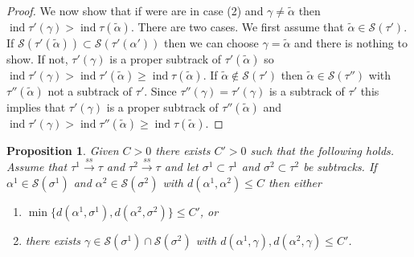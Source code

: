 \documentclass[11pt]{article}
\newtheorem{prop}[thm]{Proposition}
\theoremstyle{remark}
\def\S{{\mathcal S}}
\def\ind{\operatorname{ind}}
\def\ss{{\overset{ss}\longrightarrow}}
\begin{document}
\begin{proof}
We now show that if were are in case (2) and $\gamma \neq \tilde\alpha$ then $\ind \tau'(\gamma) > \ind{\tau}(\tilde\alpha)$. There are two cases. We first assume that $\tilde\alpha \in \S(\tau')$. If $\S(\tau'(\tilde\alpha)) \subset \S(\tau'(\alpha'))$ then we can choose $\gamma = \tilde\alpha$ and there is nothing to show. If not, $\tau'(\gamma)$ is a proper subtrack of $\tau'(\tilde\alpha)$ so $\ind \tau'(\gamma) > \ind \tau'(\tilde\alpha) \ge \ind\tau(\tilde\alpha)$. If $\tilde\alpha \not\in \S(\tau')$ then $\tilde\alpha \in \S(\tau'')$ with $\tau''(\tilde\alpha)$ not a subtrack of $\tau'$. Since $\tau''(\gamma) = \tau'(\gamma)$ is a subtrack of $\tau'$ this implies that $\tau'(\gamma)$ is a proper subtrack of $\tau''(\tilde\alpha)$ and $\ind \tau'(\gamma) > \ind \tau''(\tilde\alpha) \ge \ind\tau(\tilde\alpha)$.
\end{proof} 

\begin{prop}\label{general}
Given $C>0$ there exists $C'>0$ such that the following holds. Assume that $\tau^1 \ss \tau$ and $\tau^2 \ss \tau$ and let $\sigma^1 \subset \tau^1$ and $\sigma^2\subset \tau^2$ be subtracks. If $\alpha^1 \in \S(\sigma^1)$ and $\alpha^2\in \S(\sigma^2)$ with $d(\alpha^1, \alpha^2) \le C$ then either
\begin{enumerate}[(1)]
\item $\min\{d(\alpha^1, \sigma^1), d(\alpha^2, \sigma^2)\} \le C'$, or
\item there exists $\gamma \in \S(\sigma^1) \cap \S(\sigma^2)$ with $d(\alpha^1, \gamma), d(\alpha^2, \gamma) \le C'$.
\end{enumerate}
\end{prop}
\end{document}
